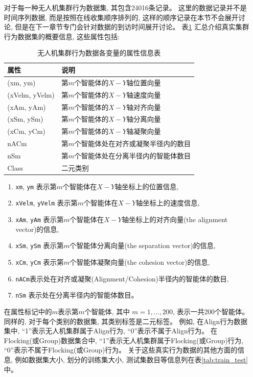 对于每一种无人机集群行为数据集, 其包含24016条记录。 这里的数据记录并不是时间序列数据, 而是按照在线收集顺序排列的, 这样的顺序记录在本节不会展开讨论, 但是在下一章节专门会针对数据的到访时间展开讨论。 表\ref{tab:datainfo} 汇总介绍真实集群行为数据集的概要信息, 这些属性包括:
\begin{table}[]
\centering
\caption{无人机集群行为数据各变量的属性信息表}
\label{tab:datainfo}
\begin{tabular}{@{}ll@{}}
\toprule
属性     & 说明                                                 \\ \midrule
(xm, ym)       & 第$m$个智能体的$X-Y$轴位置向量 \\
(xVelm, yVelm) & 第$m$个智能体的$X-Y$轴速度向量     \\
(xAm, yAm)     & 第$m$个智能体的$X-Y$轴对齐向量                      \\
(xSm, ySm)     & 第$m$个智能体的$X-Y$轴分离向量                     \\
(xCm, yCm)     & 第$m$个智能体的$X-Y$轴凝聚向量                       \\
nACm           & 第$m$个智能体处在对齐或凝聚半径内的数目 \\
nSm            & 第$m$个智能体处在分离半径内的智能体数目         \\
Class          & 二元类别                                      \\ \bottomrule
\end{tabular}
\end{table}
\begin{enumerate}
\item \texttt{xm}, \texttt{ym} 表示第$m$个智能体在$X-Y$轴坐标上的位置信息,
\item \texttt{xVelm}, \texttt{yVelm} 表示第$m$个智能体在$X-Y$轴坐标上的速度信息, 
\item \texttt{xAm}, \texttt{yAm} 表示第$m$个智能体在$X-Y$轴坐标上的对齐向量(the alignment vector)的信息, 
\item \texttt{xSm}, \texttt{ySm} 表示第$m$个智能体分离向量(the separation vector)的信息,
\item \texttt{xCm}, \texttt{yCm} 表示第$m$个智能体凝聚向量(the cohesion vector)的信息, 
\item \texttt{nACm}表示处在对齐或凝聚(Alignment/Cohesion)半径内的智能体的数目, 
\item \texttt{nSm} 表示处在分离半径内的智能体数目。
\end{enumerate}
在属性标记中的$m$表示第$m$个智能体, 其中 $m = 1,\ldots,200$, 表示一共200个智能体。 同样的, 对于每个类别的数据集, 其类别标签是二元标签。 例如, 在Align行为数据集中, “1”表示无人机集群属于Align行为, “0”表示不属于Align行为。 在Flocking(或Group)数据集合中, “1”表示无人机集群属于Flocking(或Group)行为, “0”表示不属于Flocking(或Group)行为。 关于这些真实行为数据的其他方面的信息, 例如数据集大小, 划分的训练集大小, 测试集数目等信息列在表\ref{tab:train_test}中。 
